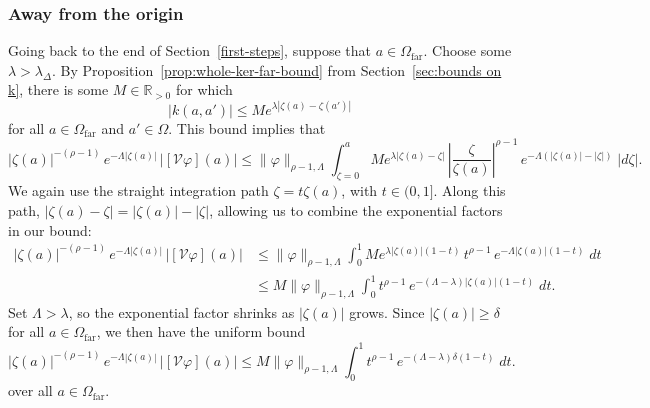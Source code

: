 \documentclass[final]{siamart220329}
\newcommand{\R}{\mathbb{R}}
\newcommand{\volterra}{\mathcal{V}}
\newcommand{\far}{\Omega_\text{far}}
\begin{document}
\subsubsection{Away from the origin}\label{far-bound}
Going back to the end of Section~\ref{first-steps}, suppose that $a \in \far$. Choose some $\lambda > \lambda_\Delta$. By Proposition~\ref{prop:whole-ker-far-bound} from Section~\ref{sec:bounds on k}, there is some $M\in\R_{>0}$ for which
\[ |k(a, a')| \le M e^{\lambda |\zeta(a) - \zeta(a')|} \]
for all $a \in \far$ and $a' \in \Omega$. This bound implies that
\[ |\zeta(a)|^{-(\rho-1)}\,e^{-\Lambda|\zeta(a)|}\,\big|[\volterra\varphi](a)\big| \le \|\varphi\|_{\rho-1, \Lambda} \int_{\zeta = 0}^a M e^{\lambda |\zeta(a) - \zeta|}\,\left|\frac{\zeta}{\zeta(a)}\right|^{\rho-1}\,e^{-\Lambda(|\zeta(a)| - |\zeta|)}\;|d\zeta|. \]
We again use the straight integration path $\zeta = t \zeta(a)$, with $t \in (0, 1]$. Along this path, $|\zeta(a) - \zeta| = |\zeta(a)| - |\zeta|$, allowing us to combine the exponential factors in our bound:
\begin{align*}
|\zeta(a)|^{-(\rho-1)}\,e^{-\Lambda|\zeta(a)|}\,\big|[\volterra\varphi](a)\big| & \le \|\varphi\|_{\rho-1, \Lambda} \int_0^1 M e^{\lambda |\zeta(a)|(1 - t)}\,t^{\rho-1}\,e^{-\Lambda |\zeta(a)|(1 - t)}\;dt \\
& \le M \|\varphi\|_{\rho-1, \Lambda} \int_0^1 t^{\rho-1}\,e^{-(\Lambda - \lambda)|\zeta(a)|(1 - t)}\;dt.
\end{align*}
Set $\Lambda > \lambda$, so the exponential factor shrinks as $|\zeta(a)|$ grows. Since $|\zeta(a)| \ge \delta$ for all $a \in \far$, we then have the uniform bound
\[ |\zeta(a)|^{-(\rho-1)}\,e^{-\Lambda|\zeta(a)|}\,\big|[\volterra\varphi](a)\big| \le M \|\varphi\|_{\rho-1, \Lambda} \int_0^1 t^{\rho-1}\,e^{-(\Lambda - \lambda)\delta(1 - t)}\;dt. \]
over all $a \in \far$.
\end{document}
